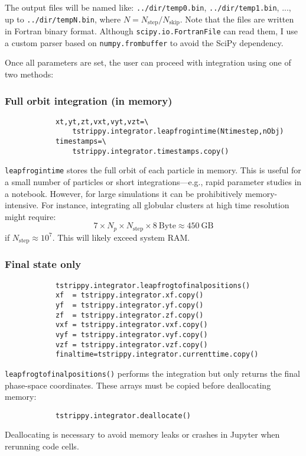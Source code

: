 \documentclass{article}
\begin{document}
        The output files will be named like: \texttt{../dir/temp0.bin}, \texttt{../dir/temp1.bin}, ..., up to \texttt{../dir/tempN.bin}, where $N = N_\mathrm{step} / N_\mathrm{skip}$. Note that the files are written in Fortran binary format. Although \texttt{scipy.io.FortranFile} can read them, I use a custom parser based on \texttt{numpy.frombuffer} to avoid the SciPy dependency.

        Once all parameters are set, the user can proceed with integration using one of two methods:

        \subsubsection*{Full orbit integration (in memory)}
        \small
        \begin{lstlisting}
            xt,yt,zt,vxt,vyt,vzt=\
                tstrippy.integrator.leapfrogintime(Ntimestep,nObj) 
            timestamps=\
                tstrippy.integrator.timestamps.copy()
        \end{lstlisting}
        \normalsize
        \texttt{leapfrogintime} stores the full orbit of each particle in memory. This is useful for a small number of particles or short integrations—e.g., rapid parameter studies in a notebook. However, for large simulations it can be prohibitively memory-intensive. For instance, integrating all globular clusters at high time resolution might require:
        \begin{equation}
            7 \times N_p \times N_\mathrm{step} \times 8~\mathrm{Byte} \approx 450~\mathrm{GB}
        \end{equation}
        if $N_\mathrm{step} \approx 10^7$. This will likely exceed system RAM.

        \subsubsection*{Final state only}
        \small
        \begin{lstlisting}
            tstrippy.integrator.leapfrogtofinalpositions()
            xf  = tstrippy.integrator.xf.copy()
            yf  = tstrippy.integrator.yf.copy()
            zf  = tstrippy.integrator.zf.copy()
            vxf = tstrippy.integrator.vxf.copy()
            vyf = tstrippy.integrator.vyf.copy()
            vzf = tstrippy.integrator.vzf.copy()
            finaltime=tstrippy.integrator.currenttime.copy()
        \end{lstlisting}
        \normalsize
        \texttt{leapfrogtofinalpositions()} performs the integration but only returns the final phase-space coordinates. These arrays must be copied before deallocating memory:
        \small
        \begin{lstlisting}
            tstrippy.integrator.deallocate()
        \end{lstlisting}
        \normalsize
        Deallocating is necessary to avoid memory leaks or crashes in Jupyter when rerunning code cells.
\end{document}
